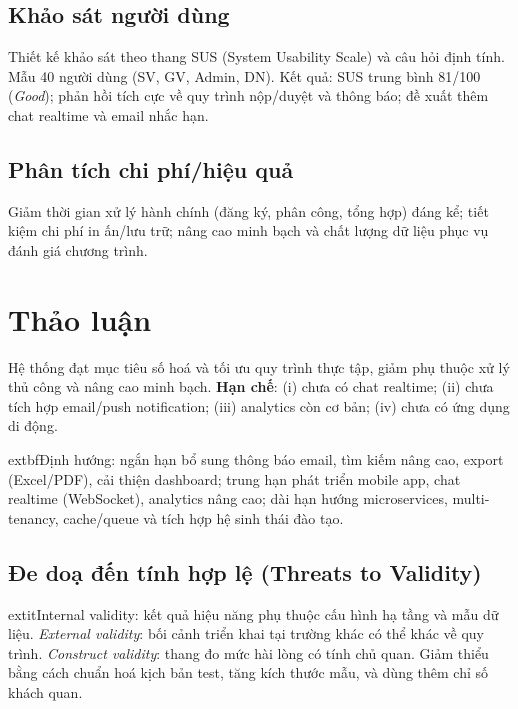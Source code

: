 \documentclass[conference]{IEEEtran}
\begin{document}

\subsection{Khảo sát người dùng}
Thiết kế khảo sát theo thang SUS (System Usability Scale) và câu hỏi định tính. Mẫu 40 người dùng (SV, GV, Admin, DN). Kết quả: SUS trung bình 81/100 (\textit{Good}); phản hồi tích cực về quy trình nộp/duyệt và thông báo; đề xuất thêm chat realtime và email nhắc hạn.

\subsection{Phân tích chi phí/hiệu quả}
Giảm thời gian xử lý hành chính (đăng ký, phân công, tổng hợp) đáng kể; tiết kiệm chi phí in ấn/lưu trữ; nâng cao minh bạch và chất lượng dữ liệu phục vụ đánh giá chương trình.

\section{Thảo luận}
Hệ thống đạt mục tiêu số hoá và tối ưu quy trình thực tập, giảm phụ thuộc xử lý thủ công và nâng cao minh bạch. \textbf{Hạn chế}: (i) chưa có chat realtime; (ii) chưa tích hợp email/push notification; (iii) analytics còn cơ bản; (iv) chưa có ứng dụng di động.

	extbf{Định hướng}: ngắn hạn bổ sung thông báo email, tìm kiếm nâng cao, export (Excel/PDF), cải thiện dashboard; trung hạn phát triển mobile app, chat realtime (WebSocket), analytics nâng cao; dài hạn hướng microservices, multi-tenancy, cache/queue và tích hợp hệ sinh thái đào tạo.

\subsection{Đe doạ đến tính hợp lệ (Threats to Validity)}
	extit{Internal validity}: kết quả hiệu năng phụ thuộc cấu hình hạ tầng và mẫu dữ liệu. \textit{External validity}: bối cảnh triển khai tại trường khác có thể khác về quy trình. \textit{Construct validity}: thang đo mức hài lòng có tính chủ quan. Giảm thiểu bằng cách chuẩn hoá kịch bản test, tăng kích thước mẫu, và dùng thêm chỉ số khách quan.
\end{document}
